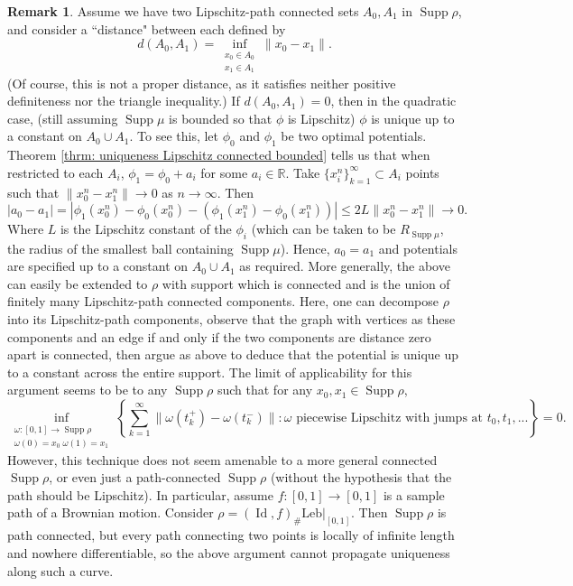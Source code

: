 \documentclass[11pt, oneside, titlepage]{book}
\theoremstyle{plain}
\theoremstyle{definition}
\newtheorem{remark}[theorem]{Remark}
\newcommand{\R}{\mathbb{R}}
\DeclareMathOperator{\id}{Id}
\DeclareMathOperator{\supp}{Supp}
\begin{document}
\begin{remark}
\label{rmk: decomposition into lip path components}
    Assume we have two Lipschitz-path connected sets $A_0, A_1$ in $\supp \rho$, and consider a ``distance" between each defined by
    \begin{equation*}
        d(A_0, A_1) = \inf_{\substack{x_0 \in A_0\\ x_1 \in A_1}} \|x_0 - x_1\|.
    \end{equation*}
    (Of course, this is not a proper distance, as it satisfies neither positive definiteness nor the triangle inequality.)
    If $d(A_0, A_1) = 0$, then in the quadratic case, (still assuming $\supp \mu$ is bounded so that $\phi$ is Lipschitz) $\phi$ is unique up to a constant on $A_0 \cup A_1$. To see this, let $\phi_0$ and $\phi_1$ be two optimal potentials. Theorem \ref{thrm: uniqueness Lipschitz connected bounded} tells us that when restricted to each $A_i$, $\phi_1 = \phi_0 + a_i$ for some $a_i \in \R$.
    Take $\{x_i^n\}_{k=1}^\infty \subset A_i$ points such that $\|x_0^n - x_1^n\| \to 0$ as $n \to \infty$. Then
    \begin{equation*}
        |a_0 - a_1| = |\phi_1(x_0^n) - \phi_0(x_0^n) - (\phi_1(x_1^n) - \phi_0(x_1^n))| \leq 2L\|x_0^n - x_1^n\| \to 0.
    \end{equation*}
    Where $L$ is the Lipschitz constant of the $\phi_i$ (which can be taken to be $R_{\supp\mu}$, the radius of the smallest ball containing $\supp \mu$). Hence, $a_0 = a_1$ and potentials are specified up to a constant on $A_0\cup A_1$ as required. More generally, the above can easily be extended to $\rho$ with support which is connected and is the union of finitely many Lipschitz-path connected components. Here, one can decompose $\rho$ into its Lipschitz-path components, observe that the graph with vertices as these components and an edge if and only if the two components are distance zero apart is connected, then argue as above to deduce that the potential is unique up to a constant across the entire support. The limit of applicability for this argument seems to be to any $\supp \rho$ such that for any $x_0, x_1 \in \supp \rho$,
    \begin{equation*}
        \inf_{\substack{\omega: [0, 1] \to \supp \rho\\ \omega(0) = x_0 \; \omega(1) = x_1}} \left\{ \sum_{k=1}^\infty \|\omega(t^+_k)- \omega(t_k^-)\| : \omega \text{ piecewise Lipschitz with jumps at } t_0, t_1, ... \right\} = 0.
    \end{equation*}
    However, this technique does not seem amenable to a more general connected $\supp\rho$, or even just a path-connected $\supp \rho$ (without the hypothesis that the path should be Lipschitz). In particular, assume $f: [0, 1] \to [0, 1]$ is a sample path of a Brownian motion. Consider $\rho = (\id, f)_\#\text{Leb}|_{[0,1]}$. Then $\supp \rho$ is path connected, but every path connecting two points is locally of infinite length and nowhere differentiable, so the above argument cannot propagate uniqueness along such a curve.
\end{remark}
\end{document}
